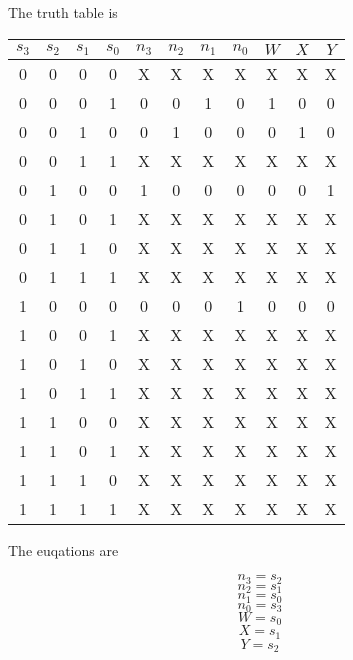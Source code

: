 The truth table is 

\begin{center}
\begin{tabular}{cccc|ccccccc}
$s_{3}$ & $s_{2}$ & $s_{1}$ & $s_{0}$ & $n_{3}$ & $n_{2}$ & $n_{1}$ & $n_{0}$ & $W$ & $X$ & $Y$ \\
\hline
0 & 0 & 0 & 0 & X & X & X & X & X & X & X \\
0 & 0 & 0 & 1 & 0 & 0 & 1 & 0 & 1 & 0 & 0 \\
0 & 0 & 1 & 0 & 0 & 1 & 0 & 0 & 0 & 1 & 0 \\
0 & 0 & 1 & 1 & X & X & X & X & X & X & X \\
0 & 1 & 0 & 0 & 1 & 0 & 0 & 0 & 0 & 0 & 1 \\
0 & 1 & 0 & 1 & X & X & X & X & X & X & X \\
0 & 1 & 1 & 0 & X & X & X & X & X & X & X \\
0 & 1 & 1 & 1 & X & X & X & X & X & X & X \\
1 & 0 & 0 & 0 & 0 & 0 & 0 & 1 & 0 & 0 & 0 \\
1 & 0 & 0 & 1 & X & X & X & X & X & X & X \\
1 & 0 & 1 & 0 & X & X & X & X & X & X & X \\
1 & 0 & 1 & 1 & X & X & X & X & X & X & X \\
1 & 1 & 0 & 0 & X & X & X & X & X & X & X \\
1 & 1 & 0 & 1 & X & X & X & X & X & X & X \\
1 & 1 & 1 & 0 & X & X & X & X & X & X & X \\
1 & 1 & 1 & 1 & X & X & X & X & X & X & X \\
\end{tabular}
\end{center}

The euqations are 

$$n_{3}=s_{2}$$
$$n_{2}=s_{1}$$
$$n_{1}=s_{0}$$
$$n_{0}=s_{3}$$
$$W=s_{0}$$
$$X=s_{1}$$
$$Y=s_{2}$$


